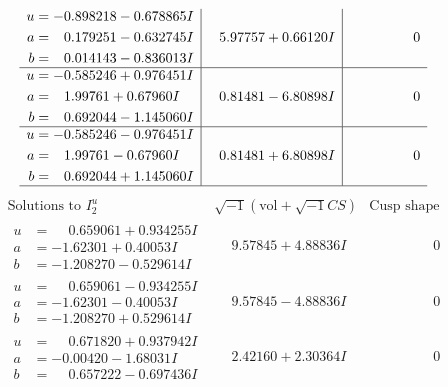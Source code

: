\documentclass[1p]{elsarticle_modified}
\theoremstyle{definition}
\newcommand{\I}{\sqrt{-1}}
\begin{document}
$$\begin{array}{c|c|c}
\begin{aligned}
u &= -0.898218 - 0.678865 I \\
a &= \phantom{-}0.179251 - 0.632745 I \\
b &= \phantom{-}0.014143 - 0.836013 I\end{aligned}
 & \phantom{-}5.97757 + 0.66120 I & \phantom{-0.000000 } 0 \\ \hline\begin{aligned}
u &= -0.585246 + 0.976451 I \\
a &= \phantom{-}1.99761 + 0.67960 I \\
b &= \phantom{-}0.692044 - 1.145060 I\end{aligned}
 & \phantom{-}0.81481 - 6.80898 I & \phantom{-0.000000 } 0 \\ \hline\begin{aligned}
u &= -0.585246 - 0.976451 I \\
a &= \phantom{-}1.99761 - 0.67960 I \\
b &= \phantom{-}0.692044 + 1.145060 I\end{aligned}
 & \phantom{-}0.81481 + 6.80898 I & \phantom{-0.000000 } 0\\
 \hline 
 \end{array}$$\newpage$$\begin{array}{c|c|c}  
\text{Solutions to }I^u_{2}& \I (\text{vol} + \sqrt{-1}CS) & \text{Cusp shape}\\
 \hline 
\begin{aligned}
u &= \phantom{-}0.659061 + 0.934255 I \\
a &= -1.62301 + 0.40053 I \\
b &= -1.208270 - 0.529614 I\end{aligned}
 & \phantom{-}9.57845 + 4.88836 I & \phantom{-0.000000 } 0 \\ \hline\begin{aligned}
u &= \phantom{-}0.659061 - 0.934255 I \\
a &= -1.62301 - 0.40053 I \\
b &= -1.208270 + 0.529614 I\end{aligned}
 & \phantom{-}9.57845 - 4.88836 I & \phantom{-0.000000 } 0 \\ \hline\begin{aligned}
u &= \phantom{-}0.671820 + 0.937942 I \\
a &= -0.00420 - 1.68031 I \\
b &= \phantom{-}0.657222 - 0.697436 I\end{aligned}
 & \phantom{-}2.42160 + 2.30364 I & \phantom{-0.000000 } 0 \\ \hline\begin{aligned}

\end{aligned}
\end{array}$$
\end{document}
